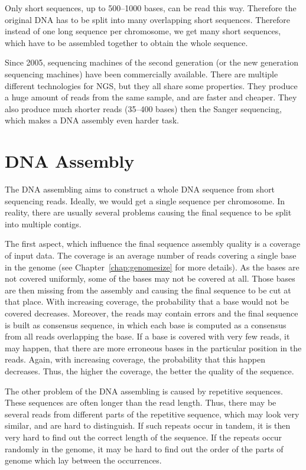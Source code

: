 Only short sequences, up to 500--1000 bases, can be read this way. Therefore the original DNA has to be split into many overlapping short sequences.
Therefore instead of one long sequence per chromosome, we get many short sequences, which have to be assembled together to obtain the whole sequence.

Since 2005, sequencing machines of the second generation (or the new generation sequencing machines) have been commercially available. There are multiple different technologies for NGS, but they all share some properties.
They produce a huge amount of reads from the same sample, and are faster and cheaper. They also produce much shorter reads (35--400 bases) then the Sanger sequencing, which makes a DNA assembly even harder task.

\section{DNA Assembly}
\label{sect:dna-assembly}

The DNA assembling aims to construct a whole DNA sequence from short sequencing reads. Ideally, we would get a single sequence per chromosome. In reality, there are usually several problems causing the final sequence to be split into multiple contigs.

The first aspect, which influence the final sequence assembly quality is a coverage of input data. The coverage is an average number of reads covering a single base in the genome (see Chapter~\ref{chap:genomesize} for more details).
As the bases are not covered uniformly, some of the bases may not be covered at all. Those bases are then missing from the assembly and causing the final sequence to be cut at that place. With increasing coverage, the probability that a base would not be covered decreases.
Moreover, the reads may contain errors and the final sequence is built as consensus sequence, in which each base is computed as a consensus from all reads overlapping the base. If a base is covered with very few reads, it may happen, that there are more erroneous bases in the particular position in the reads. Again, with increasing coverage, the probability that this happen decreases. Thus, the higher the coverage, the better the quality of the sequence.

The other problem of the DNA assembling is caused by repetitive sequences. These sequences are often longer than the read length. Thus, there may be several reads from different parts of the repetitive sequence, which may look very similar, and are hard to distinguish. If such repeats occur in tandem, it is then very hard to find out the correct length of the sequence. If the repeats occur randomly in the genome, it may be hard to find out the order of the parts of genome which lay between the occurrences.

